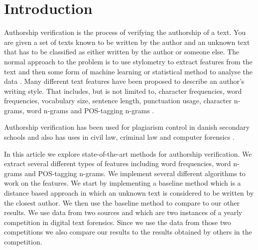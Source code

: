 \section{Introduction} \label{sec:introduction}
Authorship verification is the process of verifying the authorship of a text.
You are given a set of texts known to be written by the author and an unknown
text that has to be classified as either written by the author or someone else.
The normal approach to the problem is to use stylometry to extract features from
the text and then some form of machine learning or statistical method to analyse
the data \cite{stamatos2009}. Many different text features have been proposed
to describe an author's writing style. That includes, but is not limited to,
character frequencies, word frequencies, vocabulary size, sentence length,
punctuation usage, character n-grams, word n-grams and \gls{POS}-tagging n-grams
\cite{stamatos2009}.

Authorship verification has been used for plagiarism control in danish secondary
schools \cite{hansen2014} and also has uses in civil law, criminal law and
computer forensics \cite{stamatos2009}.

In this article we explore state-of-the-art methods for authorship verification.
We extract several different types of features including word frequencies, word
n-grams and \gls{POS}-tagging n-grams. We implement several different algorithms
to work on the features. We start by implementing a baseline method which is a
distance based approach in which an unknown text is considered to be written
by the closest author. We then use the baseline method to compare to our other
results. We use data from two sources \cite{pan:2015} and \cite{pan:2013} which
are two instances of a yearly competition in digital text forensics. Since we
use the data from those two competitions we also compare our results to the
results obtained by others in the competition.
